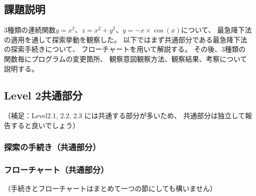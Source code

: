 \subsection{課題説明}
3種類の連続関数$y=x^2$、$z=x^2+y^2$、$y=-x \times \cos(x)$について、
最急降下法の適用を通して探索挙動を観察した。
以下ではまず共通部分である最急降下法の探索手続きについて、
フローチャートを用いて解説する。
その後、3種類の関数毎にプログラムの変更箇所、
観察意図観察方法、観察結果、考察について説明する。


\subsection{Level 2共通部分}
（補足：Level2.1, 2.2, 2.3 には共通する部分が多いため、
共通部分は独立して報告すると良いでしょう）

\subsubsection{探索の手続き（共通部分）}

\subsubsection{フローチャート（共通部分）}
（手続きとフローチャートはまとめて一つの節にしても構いません）

